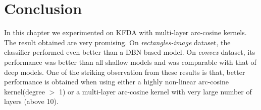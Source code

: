 \section{Conclusion}
\label{chap4_conc}
In this chapter we experimented on KFDA with multi-layer arc-cosine kernels. The result obtained are very promising. On \textit{rectangles-image} dataset, the classifier performed even better than a DBN based model. On \textit{convex} dataset, its performance was better than all shallow models 
and was comparable with that of deep models. One of the striking observation from these results is that, better performance is obtained when using either a highly non-linear arc-cosine kernel(degree $>$ 1) or a multi-layer arc-cosine kernel with very large number of layers (above 10).

